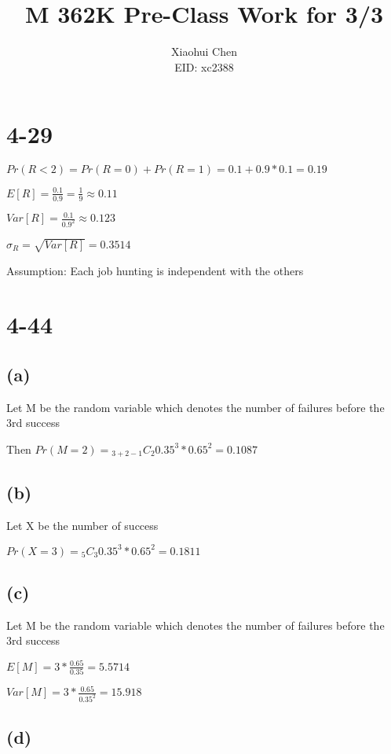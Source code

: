 \documentclass[12pt]{article}
\author{Xiaohui Chen \\EID: xc2388}
\title{M 362K Pre-Class Work for 3/3}
\begin{document}
\maketitle
\begin{spacing}{2.0}

\section*{4-29}

$Pr(R<2)= Pr(R=0)+ Pr(R=1)= 0.1+ 0.9*0.1= 0.19$

$E[R]= \frac{0.1}{0.9}= \frac{1}{9} \approx 0.11$

$Var[R]= \frac{0.1}{0.9^2}\approx 0.123$

$\sigma_R= \sqrt{Var[R]}= 0.3514$

Assumption: Each job hunting is independent with the others

\section*{4-44}

\subsection*{(a)}

Let M be the random variable which denotes the number of failures before the 3rd success

Then $Pr(M=2)= {}_{3+2-1}C_{2} 0.35^3* 0.65^2= 0.1087 $

\subsection*{(b)}

Let X be the number of success

$Pr(X=3)= {}_{5}C_{3} 0.35^3*0.65^2= 0.1811$

\subsection*{(c)}

Let M be the random variable which denotes the number of failures before the 3rd success

$E[M]= 3*\frac{0.65}{0.35}= 5.5714$

$Var[M]= 3*\frac{0.65}{0.35^2}= 15.918$

\subsection*{(d)}


\end{spacing}
\end{document}
